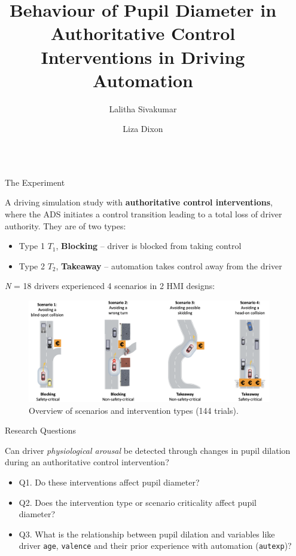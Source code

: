 \documentclass[final]{beamer}
\title{Behaviour of Pupil Diameter in Authoritative Control Interventions in Driving Automation}
\author{Lalitha Sivakumar \inst{1} \and Liza Dixon \inst{2}}
\institute[shortinst]{\inst{1} University of Tübingen \samelineand \inst{2} Robert Bosch GmbH}
\newlength{\sepwidth}
\newlength{\colwidth}
\newcommand{\separatorcolumn}{\begin{column}{\sepwidth}\end{column}}
\begin{document}
\begin{frame}[t]
\begin{columns}[t]
\separatorcolumn

\begin{column}{\colwidth}

\begin{block}{The Experiment}

    A driving simulation study with \textbf{authoritative control interventions}, where the ADS initiates a control transition leading to a total loss of driver authority. They are of two types:
    \begin{itemize}
        \item Type 1 $T_1$, \textbf{Blocking} -- driver is blocked from taking control
        \item Type 2 $T_2$, \textbf{Takeaway} -- automation takes control away from the driver
    \end{itemize}
    
    \emph{N} = 18 drivers experienced 4 scenarios in 2 HMI designs:
 
    \begin{figure}
      \centering
      \includegraphics[width=0.90\linewidth]{scenarios.png}
      \caption{Overview of scenarios and intervention types (144 trials).}
      \label{fig:enter-label}
    \end{figure}

    \begin{alertblock}{Research Questions}
     {Can driver \textit{physiological arousal} be detected through changes in pupil dilation during an authoritative control intervention?
     \begin{itemize}
         \item Q1. Do these interventions affect pupil diameter?
         \item Q2. Does the intervention type or scenario criticality affect pupil diameter?
         \item Q3. What is the relationship between pupil dilation and variables like driver \texttt{age}, \texttt{valence} and their prior experience with automation (\texttt{autexp})?
     \end{itemize}
     
}
\end{alertblock}
\end{block}
\end{column}
\end{columns}
\end{frame}
\end{document}
